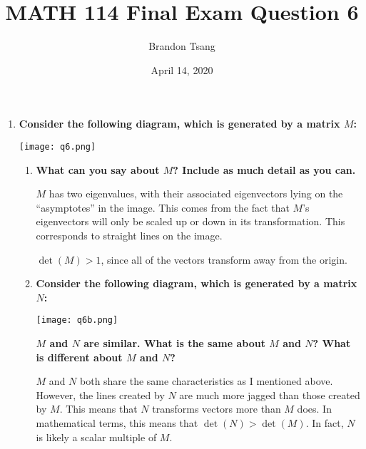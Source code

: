 \documentclass[11pt]{article}
\title{MATH 114 Final Exam Question 6}
\author{Brandon Tsang}
\date{April 14, 2020}
\begin{document}
    \maketitle
    \begin{enumerate}[label=\textbf{\arabic*.}, start=6]
        \item{
            \textbf{\boldmath Consider the following diagram, which is generated by a matrix \(M\):}
            \begin{center}
                \texttt{[image: q6.png]}
            \end{center}
            \begin{enumerate}[label=\textbf{(\alph*)}]
                \item{
                    \textbf{\boldmath What can you say about \(M\)? Include as much detail as you can.}
                    \par
                    \(M\) has two eigenvalues, with their associated eigenvectors lying on the ``asymptotes'' in the image. This comes from the fact that \(M\)'s eigenvectors will only be scaled up or down in its transformation. This corresponds to straight lines on the image.
                    \par
                    \(\det(M)>1\), since all of the vectors transform away from the origin.
                }
                \pagebreak
                \item{
                    \textbf{\boldmath Consider the following diagram, which is generated by a matrix \(N\):}
                    \begin{center}
                        \texttt{[image: q6b.png]}
                    \end{center}
                    \textbf{\boldmath \(M\) and \(N\) are similar. What is the same about \(M\) and \(N\)? What is different about \(M\) and \(N\)?}
                    \par
                    \(M\) and \(N\) both share the same characteristics as I mentioned above. However, the lines created by \(N\) are much more jagged than those created by \(M\). This means that \(N\) transforms vectors more than \(M\) does. In mathematical terms, this means that \(\det(N)>\det(M)\). In fact, \(N\) is likely a scalar multiple of \(M\).
                }
            \end{enumerate}
        }
    \end{enumerate}
\end{document}
